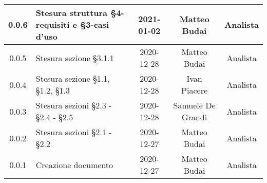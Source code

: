 \begin{center}
\begin{longtable}{|c|p{5cm}|c|c|c|}
		\hline
		0.0.6 & Stesura struttura §4-requisiti e §3-casi d'uso & 2021-01-02 & Matteo Budai & Analista \\
		\hline
		0.0.5 & Stesura sezione §3.1.1 & 2020-12-28 & Matteo Budai & Analista \\
		\hline
		0.0.4 & Stesura sezione §1.1, §1.2, §1.3 & 2020-12-28 & Ivan Piacere & Analista \\
		\hline
		0.0.3 & Stesura sezioni §2.3 - §2.4 - §2.5 & 2020-12-28 & Samuele De Grandi & Analista \\
		\hline
		0.0.2 & Stesura sezioni §2.1 - §2.2 & 2020-12-27 & Matteo Budai & Analista \\
		\hline
		0.0.1 & Creazione documento & 2020-12-27 & Matteo Budai & Analista \\
		\hline
		
	\end{longtable}
\end{center}
